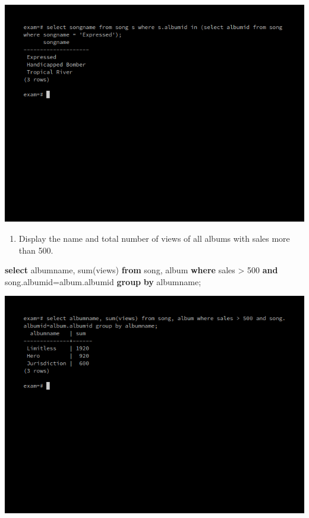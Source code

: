 \documentclass[
]{article}
\newenvironment{Shaded}{}{}
\newcommand{\DecValTok}[1]{\textcolor[rgb]{0.25,0.63,0.44}{#1}}
\newcommand{\FunctionTok}[1]{\textcolor[rgb]{0.02,0.16,0.49}{#1}}
\newcommand{\KeywordTok}[1]{\textcolor[rgb]{0.00,0.44,0.13}{\textbf{#1}}}
\newcommand{\NormalTok}[1]{#1}
\newcommand{\OperatorTok}[1]{\textcolor[rgb]{0.40,0.40,0.40}{#1}}
\providecommand{\tightlist}{%
  \setlength{\itemsep}{0pt}\setlength{\parskip}{0pt}}
\begin{document}
\includegraphics{../Images/Exam_Report/2.png}

\begin{enumerate}
\def\labelenumi{\arabic{enumi}.}
\setcounter{enumi}{3}
\tightlist
\item
  Display the name and total number of views of all albums with sales
  more than 500.
\end{enumerate}

\begin{Shaded}
\begin{Highlighting}[]
\KeywordTok{select}\NormalTok{ albumname, }\FunctionTok{sum}\NormalTok{(views) }\KeywordTok{from}\NormalTok{ song, album }
   \KeywordTok{where}\NormalTok{ sales }\OperatorTok{>} \DecValTok{500} \KeywordTok{and}\NormalTok{ song.albumid}\OperatorTok{=}\NormalTok{album.albumid }
   \KeywordTok{group} \KeywordTok{by}\NormalTok{ albumname;}
\end{Highlighting}
\end{Shaded}

\includegraphics{../Images/Exam_Report/3.png}
\end{document}
